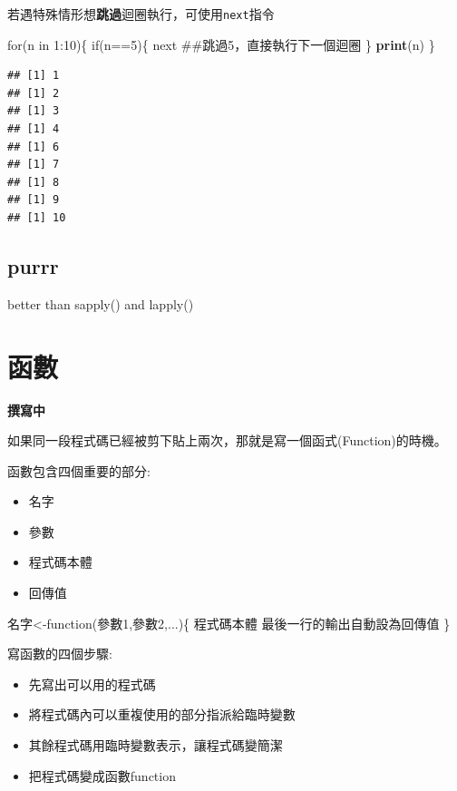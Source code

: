 \documentclass[]{book}
\newenvironment{Shaded}{\begin{snugshade}}{\end{snugshade}}
\newcommand{\KeywordTok}[1]{\textcolor[rgb]{0.13,0.29,0.53}{\textbf{{#1}}}}
\newcommand{\DecValTok}[1]{\textcolor[rgb]{0.00,0.00,0.81}{{#1}}}
\newcommand{\NormalTok}[1]{{#1}}
\providecommand{\tightlist}{%
  \setlength{\itemsep}{0pt}\setlength{\parskip}{0pt}}
\theoremstyle{definition}
\theoremstyle{definition}
\theoremstyle{remark}
\begin{document}
若遇特殊情形想\textbf{跳過}迴圈執行，可使用\texttt{next}指令

\begin{Shaded}
\begin{Highlighting}[]
\NormalTok{for(n in }\DecValTok{1}\NormalTok{:}\DecValTok{10}\NormalTok{)\{}
  \NormalTok{if(n==}\DecValTok{5}\NormalTok{)\{}
    \NormalTok{next ##跳過5，直接執行下一個迴圈}
  \NormalTok{\}}
  \KeywordTok{print}\NormalTok{(n)}
\NormalTok{\}}
\end{Highlighting}
\end{Shaded}

\begin{verbatim}
## [1] 1
## [1] 2
## [1] 3
## [1] 4
## [1] 6
## [1] 7
## [1] 8
## [1] 9
## [1] 10
\end{verbatim}

\section{purrr}\label{purrr}

better than sapply() and lapply()

\chapter{函數}\label{function}

\textbf{撰寫中}

如果同一段程式碼已經被剪下貼上兩次，那就是寫一個函式(Function)的時機。

函數包含四個重要的部分:

\begin{itemize}
\tightlist
\item
  名字
\item
  參數
\item
  程式碼本體
\item
  回傳值
\end{itemize}

\begin{Shaded}
\begin{Highlighting}[]
\NormalTok{名字<-function(參數}\DecValTok{1}\NormalTok{,參數}\DecValTok{2}\NormalTok{,...)\{}
  \NormalTok{程式碼本體}
  \NormalTok{最後一行的輸出自動設為回傳值}
\NormalTok{\}}
\end{Highlighting}
\end{Shaded}

寫函數的四個步驟:

\begin{itemize}
\tightlist
\item
  先寫出可以用的程式碼
\item
  將程式碼內可以重複使用的部分指派給臨時變數
\item
  其餘程式碼用臨時變數表示，讓程式碼變簡潔
\item
  把程式碼變成函數function
\end{itemize}
\end{document}
